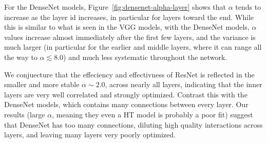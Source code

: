 For the DenseNet models, Figure~\ref{fig:densenet-alpha-layer} shows that $\alpha$ tends to increase as the layer id increases, in particular for layers toward the end.
While this is similar to what is seen in the VGG models, with the DenseNet models, $\alpha$ values increase almost immediately after the first few layers, and the variance is much larger (in particular for the earlier and middle layers, where it can range all the way to $\alpha\lesssim 8.0$) and much less systematic throughout the network.

We conjuecture that the effeciency and effectivness of ResNet is reflected in the smaller and more stable $\alpha\sim 2.0$, across nearly all layers, indicating that the inner layers are very well correlated and strongly optimized.
Contrast this with the DenseNet models, which contains many connections between every layer.
Our results (large $\alpha$, meaning they even a HT model is probably a poor fit) suggest that DenseNet has too many connections, diluting high quality interactions across layers, and leaving many layers very poorly optimized.


